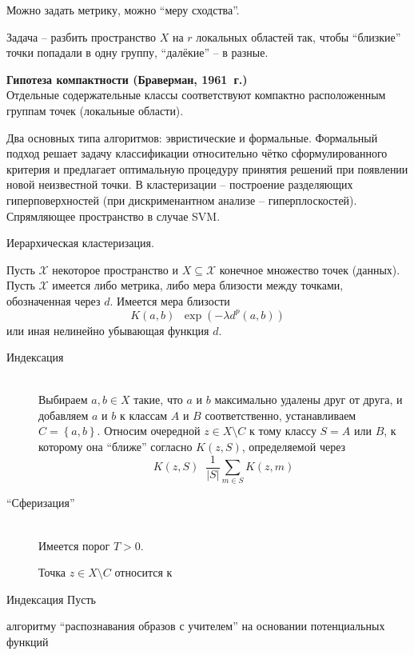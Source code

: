 \documentclass[a4paper]{article}
\newcommand{\obj}[1]{{\left\{ #1 \right \}}}
\newcommand{\brac}[1]{{\left ( #1 \right )}}
\newcommand{\abs}[1]{{\left | #1 \right |}}
\newcommand{\Xcal}{\mathcal{X}}
\newcommand{\defn}{\mathop{\overset{\Delta}{=}}\nolimits}
\newcommand{\eng}[1]{\foreignlanguage{english}{#1}}
\begin{document}
Можно задать метрику, можно ``меру сходства''.

Задача -- разбить пространство $X$ на $r$ локальных областей так, чтобы ``близкие'' точки попадали в одну группу, ``далёкие'' -- в разные.

\textbf{Гипотеза компактности (Браверман, 1961~г.)}\hfill\\
Отдельные содержательные классы соответствуют компактно расположенным группам точек (локальные области).

Два основных типа алгоритмов: эвристические и формальные.
Формальный подход решает задачу классификации относительно чётко сформулированного критерия и предлагает оптимальную процедуру принятия решений при появлении новой неизвестной точки.
В кластеризации -- построение разделяющих гиперповерхностей (при дискрименантном анализе -- гиперплоскостей). Спрямляющее пространство в случае \eng{SVM}.

Иерархическая кластеризация.

Пусть $\Xcal$ некоторое пространство и $X\subseteq \Xcal$ конечное множество точек (данных).
Пусть $\Xcal$ имеется либо метрика, либо мера близости между точками, обозначенная через $d$.
Имеется мера близости \[K(a,b) \defn \exp\brac{ -\lambda d^p(a,b) }\]
или иная нелинейно убывающая функция $d$.
\begin{description}
\item[Индексация] \hfill \\
Выбираем $a,b\in X$ такие, что $a$ и $b$ максимально удалены друг от друга,
и добавляем $a$ и $b$ к классам $A$ и $B$ соответственно,
устанавливаем $C = \obj{a,b}$. 
Относим очередной $z\in X\setminus C$ к тому классу $S=A$ или $B$, к которому она ``ближе'' согласно $K(z,S)$,
определяемой через \[K(z,S) \defn \frac{1}{\abs{S}} \sum_{m\in S} K(z,m)\]

\item[``Сферизация''] \hfill \\
Имеется порог $T>0$.

Точка $z\in X\setminus C$ относится к 

\end{description}
Индексация
Пусть 

алгоритму ``распознавания образов с учителем'' на основании потенциальных функций




\end{document}
